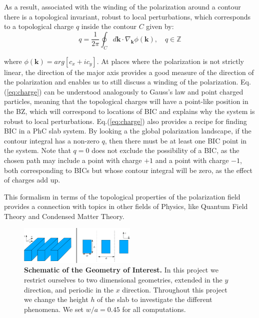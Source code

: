 As a result, associated with the winding of the polarization around a contour there is a topological invariant, robust to local perturbations, which corresponds to a topological charge $q$ inside the contour $C$ given by:
\begin{equation}\label{eq:charge}
  q = \frac{1}{2\pi} \oint_{C} d\bm{k} \cdot \nabla_{\bm{k}} \phi(\bm{k}), \quad q\in \mathbb{Z}
\end{equation}

\noindent where $\phi(\bm{k}) = arg[c_x + i c_y]$. At places where the polarization is not strictly linear, the direction of the major axis provides a good measure of the direction of the polarization and enables us to still discuss a winding of the polarization. Eq.(\ref{eq:charge}) can be understood analogously to Gauss's law and point charged particles, meaning that the topological charges will have a point-like position in the BZ, which will correspond to locations of BIC and explains why the system is robust to local perturbations. Eq.(\ref{eq:charge}) also provides a recipe for finding BIC in a PhC slab system. By looking a the global polarization landscape, if the contour integral has a non-zero $q$, then there must be at least one BIC point in the system. Note that $q=0$ does not exclude the possibility of a BIC, as the chosen path may include a point with charge $+1$ and a point with charge $-1$, both corresponding to BICs but whose contour integral will be zero, as the effect of charges add up.


This formalism in terms of the topological properties of the polarization field provides a connection with topics in other fields of Physics, like Quantum Field Theory and Condensed Matter Theory.








\begin{figure}
\centering
\includegraphics[width=0.5\textwidth]{Figures/schematic.png}
  \caption{{\bf Schematic of the Geometry of Interest.} In this project we restrict ourselves to two dimensional geometries, extended in the $y$ direction, and periodic in the $x$ direction. Throughout this project we change the height $h$ of the slab to investigate the different phenomena. We set $w/a = 0.45$ for all computations.}
  \label{fig:schematic}
\end{figure}



